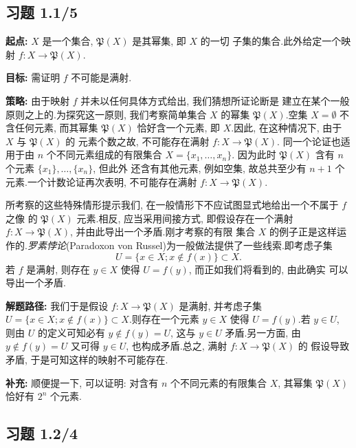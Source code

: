 \subsection*{习题 1.1/5}

\noindent\textbf{起点:} $X$ 是一个集合, $\mathfrak{P}(X)$ 是其幂集, 即 $X$ 的一切
子集的集合.此外给定一个映射 $f \colon X \longrightarrow \mathfrak{P}(X)$.

\noindent\textbf{目标:} 需证明 $f$ 不可能是满射.

\noindent\textbf{策略:} 由于映射 $f$ 并未以任何具体方式给出, 我们猜想所证论断是
建立在某个一般原则之上的.为探究这一原则, 我们考察简单集合 $X$ 的幂集
$\mathfrak{P}(X)$.空集 $X = \emptyset$ 不含任何元素, 而其幂集 $\mathfrak{P}(X)$
恰好含一个元素, 即 $X$.因此, 在这种情况下, 由于 $X$ 与 $\mathfrak{P}(X)$ 的
元素个数之故, 不可能存在满射 $f \colon X \longrightarrow \mathfrak{P}(X)$.
同一个论证也适用于由 $n$ 个不同元素组成的有限集合 $X = \{ x_1, \ldots, x_n \}$.
因为此时 $\mathfrak{P}(X)$ 含有 $n$ 个元素 $\{ x_1 \}, \ldots, \{ x_n \}$, 但此外
还含有其他元素, 例如空集, 故总共至少有 $n + 1$ 个元素.一个计数论证再次表明,
不可能存在满射 $f \colon X \longrightarrow \mathfrak{P}(X)$.

所考察的这些特殊情形提示我们, 在一般情形下不应试图显式地给出一个不属于 $f$ 之像
的 $\mathfrak{P}(X)$ 元素.相反, 应当采用间接方式, 即假设存在一个满射
$f \colon X \longrightarrow \mathfrak{P}(X)$, 并由此导出一个矛盾.刚才考察的有限
集合 $X$ 的例子正是这样运作的.\emph{罗素悖论}(\textup{Paradoxon von Russel})为一般做法提供了一些线索.即考虑子集
\[
U = \{ x \in X ; x \notin f(x) \} \subset X.
\]
若 $f$ 是满射, 则存在 $y \in X$ 使得 $U = f(y)$, 而正如我们将看到的, 由此确实
可以导出一个矛盾.

\noindent\textbf{解题路径:} 我们于是假设 $f \colon X \longrightarrow \mathfrak{P}(X)$
是满射, 并考虑子集 $U = \{ x \in X ; x \notin f(x) \} \subset X$.则存在一个元素
$y \in X$ 使得 $U = f(y)$.若 $y \in U$, 则由 $U$ 的定义可知必有
$y \notin f(y) = U$, 这与 $y \in U$ 矛盾.另一方面, 由 $y \notin f(y) = U$ 又可得
$y \in U$, 也构成矛盾.总之, 满射 $f \colon X \longrightarrow \mathfrak{P}(X)$ 的
假设导致矛盾, 于是可知这样的映射不可能存在.

\noindent\textbf{补充:} 顺便提一下, 可以证明: 对含有 $n$ 个不同元素的有限集合 $X$,
其幂集 $\mathfrak{P}(X)$ 恰好有 $2^n$ 个元素.

\subsection*{习题 1.2/4}

